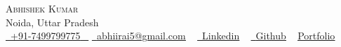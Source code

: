 \documentclass[letterpaper,11pt]{article}
\begin{document}
\begin{center}
    {\Huge \scshape Abhishek Kumar} \\ \vspace{1pt}
    Noida, Uttar Pradesh \\ \vspace{1pt}
    \small \href{tel:#}{ \raisebox{-0.1\height}\faPhone\ \underline{+91-7499799775} ~} \href{mailto:abhiirai5@gmail.com}{\raisebox{-0.2\height}\faEnvelope\  \underline{abhiirai5@gmail.com}} ~ 
    \href{www.linkedin.com/in/abhishek-kumar-226b2b112}{\raisebox{-0.2\height}\faLinkedinSquare\ \underline{Linkedin}}  ~
    \href{https://github.com/Abhishek-kumar-au25}{\raisebox{-0.2\height}\faGithub\ \underline{Github}} ~
    \href{https://github.com/Abhishek-kumar-au25}{ \underline{Portfolio}} ~
\end{center}
 \vspace{0.5mm}
\end{document}
